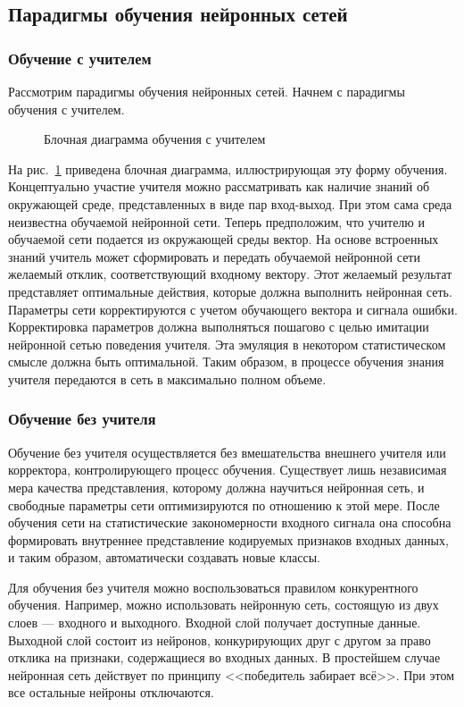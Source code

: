 \subsection{Парадигмы обучения нейронных сетей}

\subsubsection{Обучение с учителем}

Рассмотрим парадигмы обучения нейронных сетей.
Начнем с парадигмы обучения с учителем.

\begin{figure}[h]
\caption{Блочная диаграмма обучения с учителем}
\label{ris:WithTeacher}
\end{figure}

На рис.~\ref{ris:WithTeacher} приведена блочная диаграмма, иллюстрирующая эту форму обучения. 
Концептуально участие учителя можно рассматривать как наличие знаний об окружающей среде, представленных в виде пар вход-выход.
При этом сама среда неизвестна обучаемой нейронной сети.
Теперь предположим, что учителю и обучаемой сети подается из окружающей среды вектор.
На основе встроенных знаний учитель может сформировать и передать обучаемой нейронной сети желаемый отклик, соответствующий входному вектору.
Этот желаемый результат представляет оптимальные действия, которые должна выполнить нейронная сеть.
Параметры сети корректируются с учетом обучающего вектора и сигнала ошибки.
Корректировка параметров должна выполняться пошагово с целью имитации нейронной сетью поведения учителя.
Эта эмуляция в некотором статистическом смысле должна быть оптимальной.
Таким образом, в процессе обучения знания учителя передаются в сеть в максимально полном объеме.

\subsubsection{Обучение без учителя}

Обучение без учителя осуществляется без вмешательства внешнего учителя или корректора, контролирующего процесс обучения.
Существует лишь независимая мера качества представления, которому должна научиться нейронная сеть, и свободные параметры сети оптимизируются по отношению к этой мере.
После обучения сети на статистические закономерности входного сигнала она способна формировать внутреннее представление кодируемых признаков входных данных, и таким образом, автоматически создавать новые классы.

Для обучения без учителя можно воспользоваться правилом конкурентного обучения.
Например, можно использовать нейронную сеть, состоящую из двух слоев --- входного и выходного.
Входной слой получает доступные данные.
Выходной слой состоит из нейронов, конкурирующих друг с другом за право отклика на признаки, содержащиеся во входных данных.
В простейшем случае нейронная сеть действует по принципу <<победитель забирает всё>>.
При этом все остальные нейроны отключаются.